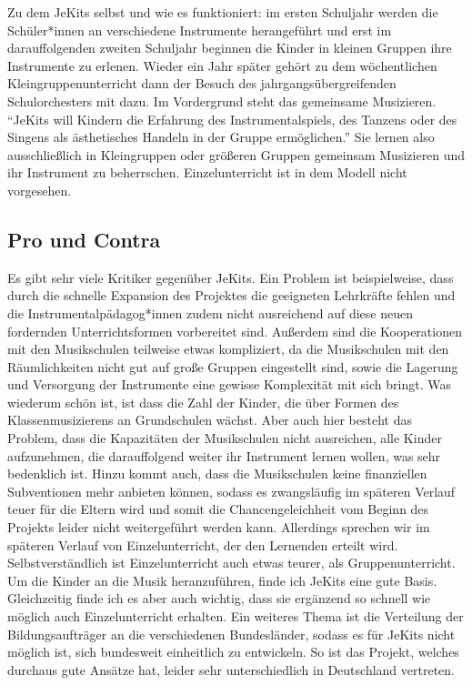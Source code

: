 Zu dem JeKits selbst und wie es funktioniert: im ersten Schuljahr werden die
Schüler*innen an verschiedene Instrumente herangeführt und erst im darauffolgenden
zweiten Schuljahr beginnen die Kinder in kleinen Gruppen ihre Instrumente zu
erlenen. Wieder ein Jahr später gehört zu dem wöchentlichen
Kleingruppenunterricht dann der Besuch des jahrgangsübergreifenden
Schulorchesters mit dazu. Im Vordergrund steht das gemeinsame Musizieren.
\enquote{JeKits will Kindern die Erfahrung des Instrumentalspiels, des Tanzens
oder des Singens als ästhetisches Handeln in der Gruppe ermöglichen.}
\autocite{https://de.wikipedia.org/wiki/JeKits}
Sie lernen also ausschließlich in Kleingruppen oder größeren Gruppen gemeinsam
Musizieren und ihr Instrument zu beherrschen. Einzelunterricht ist in dem Modell nicht vorgesehen.


\subsection{Pro und Contra}
Es gibt sehr viele Kritiker gegenüber JeKits. Ein Problem ist beispielweise,
dass durch die schnelle Expansion des Projektes die geeigneten Lehrkräfte fehlen und die
Instrumentalpädagog*innen zudem nicht ausreichend auf diese neuen fordernden
Unterrichtsformen vorbereitet sind. Außerdem sind die Kooperationen mit den
Musikschulen teilweise etwas kompliziert, da die Musikschulen mit den
Räumlichkeiten nicht gut auf große Gruppen eingestellt sind, sowie die Lagerung
und Versorgung der Instrumente eine gewisse Komplexität mit sich bringt. Was
wiederum schön ist, ist dass die Zahl der Kinder, die über Formen des
Klassenmusizierens an Grundschulen wächst. \autocite[119]{ernst:die_zukunftsfaehige_musikschule}
Aber auch hier besteht das Problem, dass die Kapazitäten der Musikschulen
nicht ausreichen, alle Kinder aufzunehmen, die darauffolgend weiter ihr
Instrument lernen wollen, was sehr bedenklich ist. Hinzu
kommt auch, dass die Musikschulen keine finanziellen Subventionen mehr anbieten
können, sodass es zwangsläufig im späteren Verlauf teuer für die Eltern wird und somit die
Chancengeleichheit vom Beginn des Projekts leider nicht weitergeführt werden
kann. Allerdings sprechen wir im späteren Verlauf von Einzelunterricht, der den
Lernenden erteilt wird. Selbstverständlich ist Einzelunterricht auch etwas
teurer, als Gruppenunterricht. Um die Kinder an die Musik heranzuführen, finde
ich JeKits eine gute Basis. Gleichzeitig finde ich es aber auch wichtig, dass
sie ergänzend so schnell wie möglich auch Einzelunterricht erhalten. 
Ein weiteres Thema ist die Verteilung der Bildungsaufträger an die verschiedenen
Bundesländer, sodass es für JeKits nicht möglich ist, sich bundesweit
einheitlich zu entwickeln. So ist das Projekt, welches durchaus gute Ansätze
hat, leider sehr unterschiedlich in Deutschland vertreten. 
